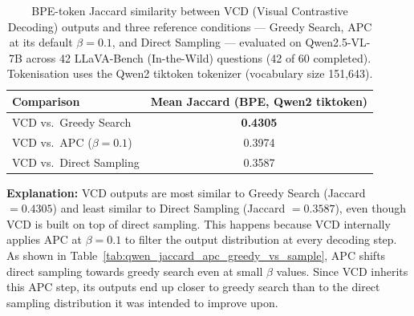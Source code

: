 \documentclass[11pt]{article}
\begin{document}
\begin{table}[ht]
\centering
\caption{BPE-token Jaccard similarity between VCD (Visual Contrastive Decoding) outputs and
three reference conditions --- Greedy Search, APC at its default $\beta{=}0.1$, and Direct
Sampling --- evaluated on Qwen2.5-VL-7B across 42 LLaVA-Bench (In-the-Wild) questions
(42 of 60 completed). Tokenisation uses the Qwen2 tiktoken tokenizer (vocabulary size
151{,}643).}
\label{tab:qwen_jaccard_vcd}

\setlength{\tabcolsep}{14pt}
\renewcommand{\arraystretch}{1.2}

\begin{tabular}{lc}
\toprule
\textbf{Comparison} & \textbf{Mean Jaccard (BPE, Qwen2 tiktoken)} \\
\midrule
VCD vs.\ Greedy Search      & \textbf{0.4305} \\
VCD vs.\ APC ($\beta=0.1$)  & 0.3974 \\
VCD vs.\ Direct Sampling    & 0.3587 \\
\bottomrule
\end{tabular}

\medskip
\noindent
\textbf{Explanation:} VCD outputs are most similar to Greedy Search (Jaccard $= 0.4305$) and
least similar to Direct Sampling (Jaccard $= 0.3587$), even though VCD is built on top of
direct sampling. This happens because VCD internally applies APC at $\beta{=}0.1$ to filter
the output distribution at every decoding step. As shown in Table~\ref{tab:qwen_jaccard_apc_greedy_vs_sample},
APC shifts direct sampling towards greedy search even at small $\beta$ values. Since VCD
inherits this APC step, its outputs end up closer to greedy search than to the direct
sampling distribution it was intended to improve upon.

\end{table}
\end{document}
